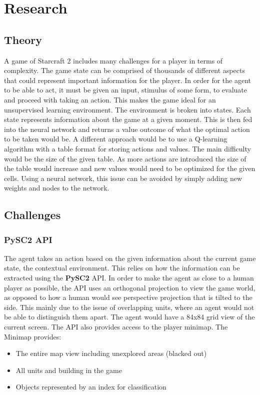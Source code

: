 \chapter{Research}
\label{research}

\section{Theory}
A game of Starcraft 2 includes many challenges for a player in terms of complexity. The game state can be comprised of thousands of different aspects that could represent important information for the player. In order for the agent to be able to act, it must be given an input, stimulus of some form, to evaluate and proceed with taking an action. This makes the game ideal for an unsupervised learning environment.
The environment is broken into states. Each state represents information about the game at a given moment. This is then fed into the neural network and returns a value outcome of what the optimal action to be taken would be.
A different approach would be to use a Q-learning algorithm with a table format for storing actions and values. The main difficulty would be the size of the given table. As more actions are introduced the size of the table would increase and new values would need to be optimized for the given cells. Using a neural network, this issue can be avoided by simply adding new weights and nodes to the network.

\section{Challenges}


\subsection{PySC2 API}
The agent takes an action based on the given information about the current game state, the contextual environment. This relies on how the information can be extracted using the \textbf{PySC2} API.
In order to make the agent as close to a human player as possible, the API uses an orthogonal projection to view the game world, as opposed to how a human would see perspective projection that is tilted to the side. This mainly due to the issue of overlapping units, where an agent would not be able to distinguish them apart. The agent would have a 84x84 grid view of the current screen. The API also provides access to the player minimap. The Minimap provides:
\begin{itemize}
\item The entire map view including unexplored areas (blacked out)
\item All units and building in the game
\item Objects represented by an index for classification
\end{itemize}

